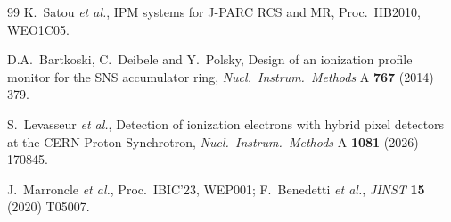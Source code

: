 \documentclass[hyperref]{cernrep}
\begin{document}
\begin{thebibliography}{99}
K.~Satou \emph{et al.}, IPM systems for J-PARC RCS and MR, Proc.\
HB2010, WEO1C05.

D.A.~Bartkoski, C.~Deibele and Y.~Polsky, Design of an ionization
profile monitor for the SNS accumulator ring,
\emph{Nucl.\ Instrum.\ Methods} A \textbf{767} (2014) 379.

S.~Levasseur \emph{et al.}, Detection of ionization electrons with
hybrid pixel detectors at the CERN Proton Synchrotron,
\emph{Nucl.\ Instrum.\ Methods} A \textbf{1081} (2026) 170845.

J.~Marroncle \emph{et al.}, Proc.\ IBIC'23, WEP001;
F.~Benedetti \emph{et al.}, \emph{JINST} \textbf{15} (2020) T05007.

\end{thebibliography}
\end{document}
